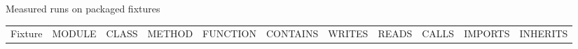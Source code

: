 \documentclass[
  ignorenonframetext,
]{beamer}
\newcounter{none} %
\begin{document}
\begin{frame}[fragile]{Measured runs on packaged fixtures}
{\def\LTcaptype{none} %
\begin{longtable}[]{@{}
  >{\raggedright\arraybackslash}p{}
  >{\raggedleft\arraybackslash}p{}
  >{\raggedleft\arraybackslash}p{}
  >{\raggedleft\arraybackslash}p{}
  >{\raggedleft\arraybackslash}p{}
  >{\raggedleft\arraybackslash}p{}
  >{\raggedleft\arraybackslash}p{}
  >{\raggedleft\arraybackslash}p{}
  >{\raggedleft\arraybackslash}p{}
  >{\raggedleft\arraybackslash}p{}
  >{\raggedleft\arraybackslash}p{}@{}}
\toprule\noalign{}
\begin{minipage}[b]{\linewidth}\raggedright
Fixture
\end{minipage} & \begin{minipage}[b]{\linewidth}\raggedleft
MODULE
\end{minipage} & \begin{minipage}[b]{\linewidth}\raggedleft
CLASS
\end{minipage} & \begin{minipage}[b]{\linewidth}\raggedleft
METHOD
\end{minipage} & \begin{minipage}[b]{\linewidth}\raggedleft
FUNCTION
\end{minipage} & \begin{minipage}[b]{\linewidth}\raggedleft
CONTAINS
\end{minipage} & \begin{minipage}[b]{\linewidth}\raggedleft
WRITES
\end{minipage} & \begin{minipage}[b]{\linewidth}\raggedleft
READS
\end{minipage} & \begin{minipage}[b]{\linewidth}\raggedleft
CALLS
\end{minipage} & \begin{minipage}[b]{\linewidth}\raggedleft
IMPORTS
\end{minipage} & \begin{minipage}[b]{\linewidth}\raggedleft
INHERITS
\end{minipage} \\

\end{longtable}}
\end{frame}
\end{document}
